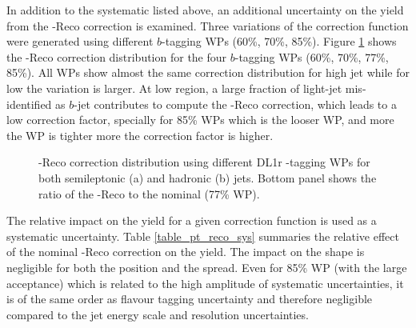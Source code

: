 In addition to the systematic listed above, an additional uncertainty on the yield from the \pT-Reco correction is examined. Three variations of the correction function were generated using different $b$-tagging WPs (60\%, 70\%, 85\%). Figure \ref{fig:HHyybb:Sys:Exp:PtReco} shows the \pT-Reco correction distribution for the four $b$-tagging WPs (60\%, 70\%, 77\%, 85\%). All WPs show almost the same correction distribution for high \pT jet while for low \pT the variation is larger. At low \pT region, a large fraction of light-jet mis-identified as $b$-jet contributes to compute the \pT-Reco correction, which leads to a low correction factor, specially for 85\% WPs which is the looser WP, and more the WP is tighter more the correction factor is higher.\\
\begin{figure}[htbp]
   \centering
   \quad
   \begin{tcolorbox}[colback=black!5!white,colframe=white!75!black]
   \caption{\pT-Reco correction distribution using different DL1r \bq-tagging WPs for both semileptonic (a) and hadronic (b) jets. Bottom panel shows the ratio of the \pT-Reco to the nominal (77\% WP). }
   \label{fig:HHyybb:Sys:Exp:PtReco}
   \end{tcolorbox}
   
\end{figure}
The relative impact on the yield for a given correction function is used as a systematic uncertainty. Table \ref{table_pt_reco_sys} summaries the relative effect of the nominal \pT-Reco correction on the yield. The impact on the shape is negligible for both the position and the spread. Even for 85\% WP (with the large acceptance)  which is related to the high amplitude of systematic uncertainties, it is of the same order as flavour tagging uncertainty and therefore negligible compared to the jet energy scale and resolution uncertainties.   
